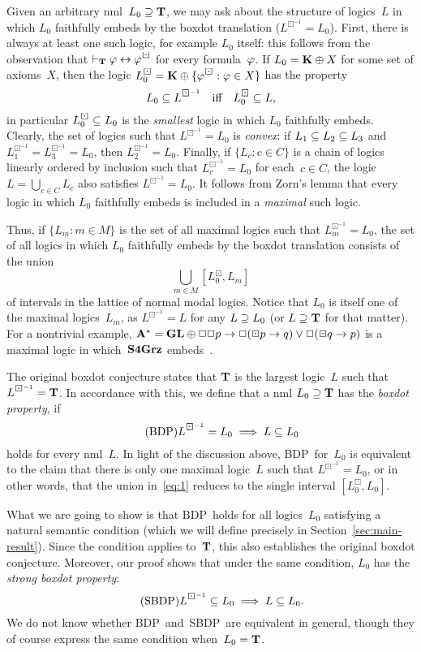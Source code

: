 \documentclass[leqno,draft,11pt]{article}
\def\bdi#1{#1^{\boxdot^{-1}}}
\def\wbc{BDP}
\def\sbc{SBDP}
\begin{document}
Given an arbitrary nml~$L_0\supseteq\mathbf T$, we may ask about the
structure of logics~$L$ in which $L_0$ faithfully embeds by the boxdot
translation ($\bdi L=L_0$). First, there is always at least one such logic, for
example $L_0$ itself: this follows from the observation that
$\vdash_\lgc T\fii\eq\fii^\boxdot$ for every formula~$\varphi$. If
$L_0=\mathbf K\oplus X$ for some set of axioms~$X$, then the logic
$L_0^\boxdot=\lgc K\oplus\{\fii^\boxdot:\fii\in X\}$ has the property
\[L_0\sset\bdi L\iff L_0^\boxdot\sset L,\]
in particular $L_0^\boxdot\sset L_0$ is the \emph{smallest} logic in which
$L_0$ faithfully embeds. Clearly, the set of logics such that $\bdi
L=L_0$ is \emph{convex}: if $L_1\subseteq L_2\subseteq L_3$ and
$\bdi{L_1}=\bdi{L_3}=L_0$, then $\bdi{L_2}=L_0$. Finally, if
$\{L_c:c\in C\}$ is a chain of logics linearly ordered by inclusion
such that $\bdi{L_c}=L_0$ for each~$c\in C$, the logic
$L=\bigcup_{c\in C}L_c$ also satisfies $\bdi L=L_0$. It follows from
Zorn's lemma that every logic in which $L_0$ faithfully embeds is
included in a \emph{maximal} such logic.

Thus, if $\{L_m:m\in M\}$ is the set of all maximal logics such that
$\bdi{L_m}=L_0$, the set of all logics in which $L_0$ faithfully
embeds by the boxdot translation consists of the union
\begin{equation}\label{eq:1}
\bigcup_{m\in M}[L_0^\boxdot,L_m]
\end{equation}
of intervals in the lattice of normal modal logics. Notice that $L_0$
is itself one of the maximal logics~$L_m$, as
$\bdi L=L$ for any $L\supseteq L_0$ (or $L\supseteq\mathbf T$ for that matter).
For a nontrivial example, $\lgc{A^*}=\lgc{GL}\oplus\Box\Box
p\to\Box(\boxdot p\to q)\lor\Box(\boxdot q\to p)$ is a maximal logic
in which~$\mathbf{S4Grz}$ embeds~\cite[Exer.~9.26]{cha-zax}.

The original boxdot conjecture states that $\mathbf T$ is the largest
logic~$L$ such that $\bdi L=\lgc T$. In accordance with this, we define
that a nml $L_0\supseteq\mathbf T$ has the \emph{boxdot
property}, if
\[\tag{\wbc} \bdi L=L_0\implies L\sset L_0\]
holds for every nml~$L$. In light of the discussion above, \wbc\
for~$L_0$ is equivalent to the claim that there is only one maximal
logic~$L$ such that $\bdi L=L_0$, or in other words, that the union
in~\eqref{eq:1} reduces to the single interval $[L_0^\boxdot,L_0]$.

What we are going to show is that \wbc\ holds for all logics~$L_0$
satisfying a natural semantic condition (which we will define
precisely in Section~\ref{sec:main-result}). Since the condition applies to~$\mathbf
T$, this also establishes the original boxdot conjecture. Moreover,
our proof shows that under the same condition, $L_0$ has the
\emph{strong boxdot property}:
\[\tag{\sbc} \bdi L\sset L_0\implies L\sset L_0.\]
We do not know whether \wbc\ and~\sbc\ are equivalent in general, though
they of course express the same condition when~$L_0=\mathbf T$.
\end{document}
